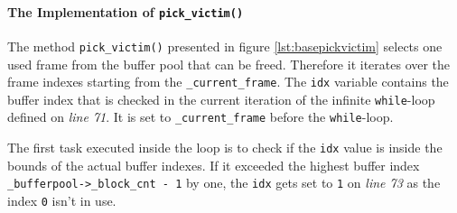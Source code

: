 %		

%		

\paragraph{The Implementation of \lstinline{pick_victim()}}

\begin{@empty}
	\lstset{
		language = [ISO]C++,
		style = basic
	}
	\begin{code}[ht!]
		\caption{Implementation of \lstinline{page_evictioner_base::pick_victim()}} \label{lst:basepickvictim}
		
	\end{code}
\end{@empty}

	The method \lstinline{pick_victim()} presented in figure \ref{lst:basepickvictim} selects one used frame from the buffer pool that can be freed. Therefore it iterates over the frame indexes starting from the \lstinline{_current_frame}. The \lstinline{idx} variable contains the buffer index that is checked in the current iteration of the infinite \lstinline{while}-loop defined on \emph{line 71}. It is set to \lstinline{_current_frame} before the \lstinline{while}-loop.
	
	The first task executed inside the loop is to check if the \lstinline{idx} value is inside the bounds of the actual buffer indexes. If it exceeded the highest buffer index \lstinline{_bufferpool->_block_cnt - 1} by one, the \lstinline{idx} gets set to \lstinline{1} on \emph{line 73} as the index \lstinline{0} isn't in use.
	
